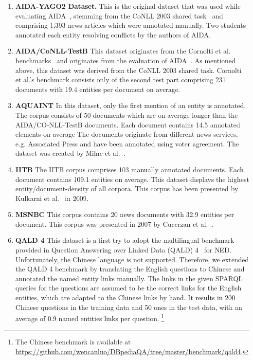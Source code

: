 \begin{enumerate}
\item \textbf{AIDA-YAGO2 Dataset.}
This is the original dataset that was used while evaluating AIDA~\cite{AIDA}, stemming from the CoNLL 2003 shared task~\cite{conll2003} and comprising 1,393 news articles which were annotated manually. %
Two students annotated each entity resolving conflicts by the authors of AIDA. 

\item  \textbf{AIDA/CoNLL-TestB} This dataset originates from the Cornolti et al. benchmarks~\cite{cornolti} and originates from the evaluation of AIDA~\cite{AIDA}. 
As mentioned above, this dataset was derived from the CoNLL 2003 shared task. %
Cornolti et al.'s benchmark consists only of the second test part comprising 231 documents with 19.4 entities per document on average.

\item \textbf{AQUAINT} In this dataset, only the first mention of an entity is annotated. The corpus consists of 50 documents which are on average longer than the AIDA/CO-NLL-TestB documents. Each document contains 14.5 annotated elements on average
The documents originate from different news services, e.g. Associated Press and have been annotated using voter agreement.
The dataset was created by Milne et al.~\cite{milne2008learning}.

\item \textbf{IITB} The IITB corpus comprises 103 manually annotated documents. Each document contains 109.1 entities on average.
This dataset displays the highest entity/document-density of all corpora.
This corpus has been presented by Kulkarni et al.~\cite{kulkarni2009collective} in 2009.

\item \textbf{MSNBC} This corpus contains 20 news documents with 32.9 entities per document. This corpus was presented in 2007 by Cucerzan et al.~\cite{Cucerzan07}.

\item \textbf{QALD 4} This dataset is a first try to adopt the multilingual benchmark provided in Question Answering over Linked Data (\ac{QALD}) 4~\cite{qald4} for \ac{NED}. Unfortunately, the Chinese language is not supported. Therefore, we extended the QALD 4 benchmark by translating the English questions to Chinese and annotated the named entity links manually. The links in the given SPARQL queries for the questions are assumed to be the correct links for the English entities, which are adapted to the Chinese links by hand. It results in 200 Chinese questions in the training data and 50 ones in the test data, with an average of 0.9 named entities links per question. \footnote{The Chinese benchmark is available at \url{https://github.com/wencanluo/DBpediaQA/tree/master/benchmark/qald4}.}

\end{enumerate}

